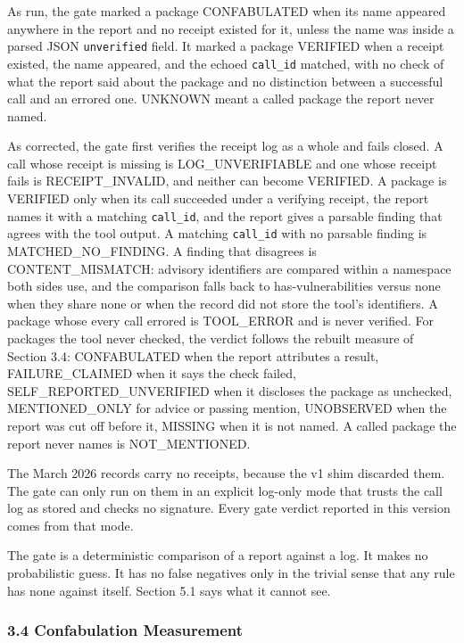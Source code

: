 \documentclass[
]{article}
\newcounter{none} %
\begin{document}
As run, the gate marked a package CONFABULATED when its name appeared
anywhere in the report and no receipt existed for it, unless the name
was inside a parsed JSON \texttt{unverified} field. It marked a package
VERIFIED when a receipt existed, the name appeared, and the echoed
\texttt{call\_id} matched, with no check of what the report said about
the package and no distinction between a successful call and an errored
one. UNKNOWN meant a called package the report never named.

As corrected, the gate first verifies the receipt log as a whole and
fails closed. A call whose receipt is missing is LOG\_UNVERIFIABLE and
one whose receipt fails is RECEIPT\_INVALID, and neither can become
VERIFIED. A package is VERIFIED only when its call succeeded under a
verifying receipt, the report names it with a matching
\texttt{call\_id}, and the report gives a parsable finding that agrees
with the tool output. A matching \texttt{call\_id} with no parsable
finding is MATCHED\_NO\_FINDING. A finding that disagrees is
CONTENT\_MISMATCH: advisory identifiers are compared within a namespace
both sides use, and the comparison falls back to has-vulnerabilities
versus none when they share none or when the record did not store the
tool's identifiers. A package whose every call errored is TOOL\_ERROR
and is never verified. For packages the tool never checked, the verdict
follows the rebuilt measure of Section 3.4: CONFABULATED when the report
attributes a result, FAILURE\_CLAIMED when it says the check failed,
SELF\_REPORTED\_UNVERIFIED when it discloses the package as unchecked,
MENTIONED\_ONLY for advice or passing mention, UNOBSERVED when the
report was cut off before it, MISSING when it is not named. A called
package the report never names is NOT\_MENTIONED.

The March 2026 records carry no receipts, because the v1 shim discarded
them. The gate can only run on them in an explicit log-only mode that
trusts the call log as stored and checks no signature. Every gate
verdict reported in this version comes from that mode.

The gate is a deterministic comparison of a report against a log. It
makes no probabilistic guess. It has no false negatives only in the
trivial sense that any rule has none against itself. Section 5.1 says
what it cannot see.

\subsubsection{3.4 Confabulation
Measurement}\label{confabulation-measurement}
\end{document}
